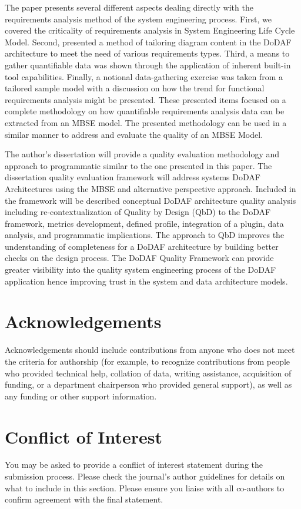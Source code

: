 \documentclass[num-refs]{wiley-article}
\begin{document}
The paper presents several different aspects dealing directly with the requirements analysis method of the system engineering process. First, we covered the criticality of requirements analysis in System Engineering Life Cycle Model. Second, presented a method of tailoring diagram content in the DoDAF architecture to meet the need of various requirements types. Third, a means to gather quantifiable data was shown through the application of inherent built-in tool capabilities. Finally, a notional data-gathering exercise was taken from a tailored sample model with a discussion on how the trend for functional requirements analysis might be presented. These presented items focused on a complete methodology on how quantifiable requirements analysis data can be extracted from an MBSE model. The presented methodology can be used in a similar manner to address and evaluate the quality of an MBSE Model. 

The author's dissertation will provide a quality evaluation methodology and approach to programmatic similar to the one presented in this paper. The dissertation quality evaluation framework will address systems DoDAF Architectures using the MBSE and alternative perspective approach. Included in the framework will be described conceptual DoDAF architecture quality analysis including re-contextualization of Quality by Design (QbD) to the DoDAF framework, metrics development, defined profile, integration of a plugin, data analysis, and programmatic implications.  The approach to QbD improves the understanding of completeness for a DoDAF architecture by building better checks on the design process. The DoDAF Quality Framework can provide greater visibility into the quality system engineering process of the DoDAF application hence improving trust in the system and data architecture models.

\section*{Acknowledgements}
Acknowledgements should include contributions from anyone who does not meet the criteria for authorship (for example, to recognize contributions from people who provided technical help, collation of data, writing assistance, acquisition of funding, or a department chairperson who provided general support), as well as any funding or other support information.

\section*{Conflict of Interest}
You may be asked to provide a conflict of interest statement during the submission process. Please check the journal's author guidelines for details on what to include in this section. Please ensure you liaise with all co-authors to confirm agreement with the final statement.

\printendnotes


\end{document}
